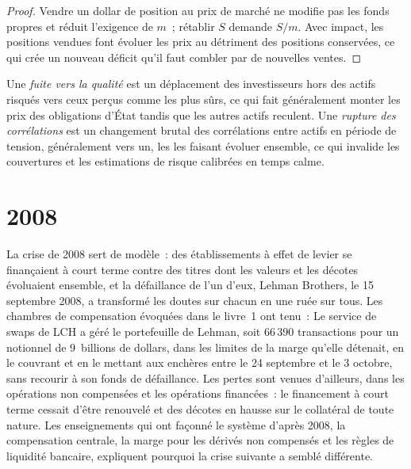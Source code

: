 \begin{proof}
Vendre un dollar de position au prix de marché ne modifie pas les fonds propres et réduit l'exigence de $m$~; rétablir $S$ demande $S/m$. Avec impact, les positions vendues
font évoluer les prix au détriment des positions conservées, ce qui crée un nouveau déficit qu'il faut combler par de nouvelles ventes.
\end{proof}

\begin{definition}\label{def:m3:when-markets-break-together:flight}
Une \emph{fuite vers la qualité} est un déplacement des investisseurs hors des actifs risqués vers ceux perçus comme les plus sûrs, ce qui fait généralement monter les
prix des obligations d'État tandis que les autres actifs reculent. Une \emph{rupture des corrélations} est un changement brutal des corrélations
entre actifs en période de tension, généralement vers un, les  les faisant évoluer ensemble, ce qui invalide les couvertures et les estimations de risque calibrées en temps calme.
\end{definition}

\section{2008}

La crise de 2008 sert de modèle~: des établissements à effet de levier se finançaient à court terme contre des titres dont les valeurs et les décotes évoluaient ensemble, et la
défaillance de l'un d'eux, Lehman Brothers, le 15 septembre 2008, a transformé les doutes sur chacun en une ruée sur tous. Les chambres de compensation évoquées dans le livre~1 ont tenu~:
Le service de swaps de LCH a géré le portefeuille de Lehman, soit 66\,390 transactions pour un notionnel de 9~billions de dollars, dans les limites de la marge qu'elle détenait, en le couvrant et en le mettant aux enchères
entre le 24 septembre et le 3 octobre, sans recourir à son fonds de défaillance. Les pertes sont venues d'ailleurs, dans les opérations non compensées et les opérations financées~: le financement à court terme cessait d'être renouvelé
et des décotes en hausse sur le collatéral de toute nature. Les
enseignements qui ont façonné le système d'après 2008, la compensation centrale, la marge pour les dérivés non compensés et les règles de liquidité bancaire, expliquent pourquoi la crise suivante a semblé
différente.

